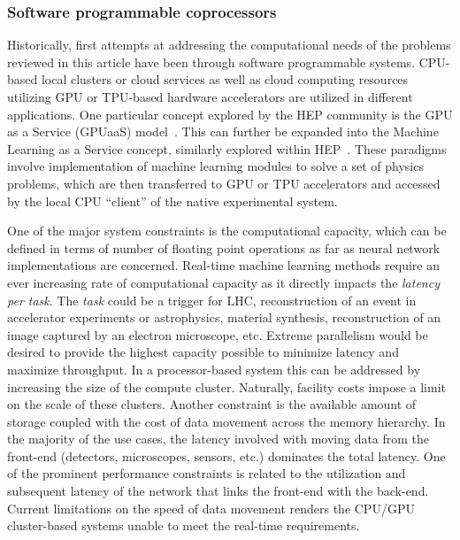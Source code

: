 \subsubsection{Software programmable coprocessors}
Historically, first attempts at addressing the computational needs of the problems reviewed in this article have been through software programmable systems. CPU-based local clusters or cloud services as well as cloud computing resources utilizing GPU or TPU-based hardware accelerators are utilized in different applications. One particular concept explored by the HEP community is the GPU as a Service (GPUaaS) model~\cite{krupa2020gpu}. 
This can further be expanded into the Machine Learning as a Service concept, similarly explored within HEP~\cite{kuznetsov2020mlaas4hep}. 
These paradigms involve implementation of machine learning modules to solve a set of physics problems, which are then transferred to GPU or TPU accelerators and accessed by the local CPU ``client'' of the native experimental system. 

One of the major system constraints is the computational capacity, which can be defined in terms of number of floating point operations as far as neural network implementations are concerned. 
Real-time machine learning methods require an ever increasing rate of computational capacity as it directly impacts the \textit{latency per task}. 
The \textit{task} could be a trigger for LHC, reconstruction of an event in accelerator experiments or astrophysics, material synthesis, reconstruction of an image captured by an electron microscope, etc. 
Extreme parallelism would be desired to provide the highest capacity possible to minimize latency and maximize throughput. 
In a processor-based system this can be addressed by increasing the size of the compute cluster. 
Naturally, facility costs impose a limit on the scale of these clusters. 
Another constraint is the available amount of storage coupled with the cost of data movement across the memory hierarchy. 
In the majority of the use cases, the latency involved with moving data from the front-end (detectors, microscopes, sensors, etc.) dominates the total latency. 
One of the prominent performance constraints is related to the utilization and subsequent latency of the network that links the front-end with the back-end. Current limitations on the speed of data movement renders the CPU/GPU cluster-based systems unable to meet the real-time requirements.               
